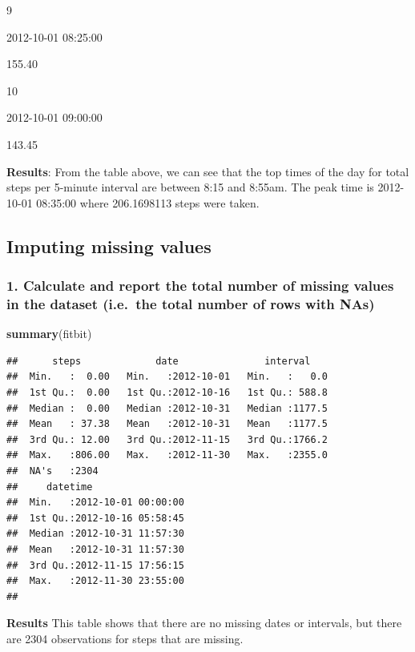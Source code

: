 \documentclass[]{article}
\newenvironment{Shaded}{\begin{snugshade}}{\end{snugshade}}
\newcommand{\KeywordTok}[1]{\textcolor[rgb]{0.13,0.29,0.53}{\textbf{#1}}}
\newcommand{\NormalTok}[1]{#1}
\begin{document}
9

2012-10-01 08:25:00

155.40

10

2012-10-01 09:00:00

143.45

\textbf{Results}: From the table above, we can see that the top times of
the day for total steps per 5-minute interval are between 8:15 and
8:55am. The peak time is 2012-10-01 08:35:00 where 206.1698113 steps
were taken.

\subsection{Imputing missing values}\label{imputing-missing-values}

\subsubsection{1. Calculate and report the total number of missing
values in the dataset (i.e.~the total number of rows with
NAs)}\label{calculate-and-report-the-total-number-of-missing-values-in-the-dataset-i.e.the-total-number-of-rows-with-nas}

\begin{Shaded}
\begin{Highlighting}[]
\KeywordTok{summary}\NormalTok{(fitbit)}
\end{Highlighting}
\end{Shaded}

\begin{verbatim}
##      steps             date               interval     
##  Min.   :  0.00   Min.   :2012-10-01   Min.   :   0.0  
##  1st Qu.:  0.00   1st Qu.:2012-10-16   1st Qu.: 588.8  
##  Median :  0.00   Median :2012-10-31   Median :1177.5  
##  Mean   : 37.38   Mean   :2012-10-31   Mean   :1177.5  
##  3rd Qu.: 12.00   3rd Qu.:2012-11-15   3rd Qu.:1766.2  
##  Max.   :806.00   Max.   :2012-11-30   Max.   :2355.0  
##  NA's   :2304                                          
##     datetime                  
##  Min.   :2012-10-01 00:00:00  
##  1st Qu.:2012-10-16 05:58:45  
##  Median :2012-10-31 11:57:30  
##  Mean   :2012-10-31 11:57:30  
##  3rd Qu.:2012-11-15 17:56:15  
##  Max.   :2012-11-30 23:55:00  
## 
\end{verbatim}

\textbf{Results} This table shows that there are no missing dates or
intervals, but there are 2304 observations for steps that are missing.
\end{document}
